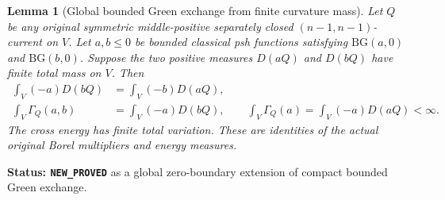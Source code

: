 \documentclass[11pt,a4paper]{article}
\numberwithin{equation}{section}
\newtheorem{lemma}[theorem]{Lemma}
\theoremstyle{definition}
\theoremstyle{remark}
\begin{document}
\begin{lemma}[Global bounded Green exchange from finite curvature mass]
\label{lem:r11-global-bounded-Green}
Let $Q$ be any original symmetric middle-positive separately closed
$(n-1,n-1)$-current on $V$. Let $a,b\leq0$ be bounded classical
psh functions satisfying $\mathrm{BG}(a,0)$ and
$\mathrm{BG}(b,0)$. Suppose the two positive measures
$D(aQ)$ and $D(bQ)$ have finite total mass on $V$. Then
\[
 \begin{split}
  \int_V(-a)D(bQ)&=\int_V(-b)D(aQ),\\
  \int_V\Gamma_Q(a,b)&=\int_V(-a)D(bQ),\qquad
  \int_V\Gamma_Q(a)=\int_V(-a)D(aQ)<\infty.
 \end{split}
 \tag{GE1}
\]
The cross energy has finite total variation. These are identities
of the actual original Borel multipliers and energy measures.
\end{lemma}

\noindent\textbf{Status: \texttt{NEW\_PROVED}} as a global
zero-boundary extension of compact bounded Green exchange.
\end{document}
